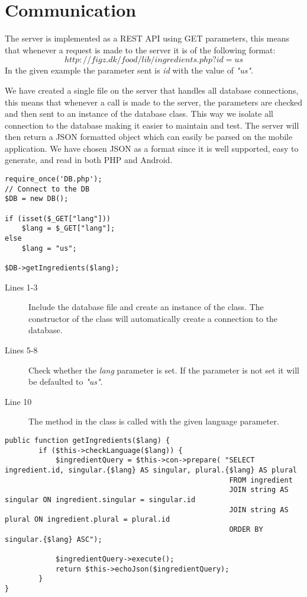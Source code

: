 \section{Communication}
\label{sec:com}

The server is implemented as a REST API using GET parameters, this means that whenever a request is made to the server it is of the following format: $$http://figz.dk/food/lib/ingredients.php?id=us$$ In the given example the parameter sent is \textit{id} with the value of \textit{"us"}.

We have created a single file on the server that handles all database connections, this means that whenever a call is made to the server, the parameters are checked and then sent to an instance of the database class. This way we isolate all connection to the database making it easier to maintain and test. The server will then return a JSON formatted object which can easily be parsed on the mobile application. We have chosen JSON as a format since it is well supported, easy to generate, and read in both PHP and Android.

\begin{lstlisting}[language=phpstyle, caption=ingredients.php]
require_once('DB.php');
// Connect to the DB
$DB = new DB();

if (isset($_GET["lang"]))
	$lang = $_GET["lang"];
else
	$lang = "us";

$DB->getIngredients($lang);
\end{lstlisting}%

\begin{description}
\item[Lines 1-3] Include the database file and create an instance of the  class. The constructor of the  class will automatically create a connection to the database.
\item[Lines 5-8] Check whether the \textit{lang} parameter is set. If the parameter is not set it will be defaulted to \textit{"us"}.
\item[Line 10] The method  in the  class is called with the given language parameter.
\end{description}

\begin{lstlisting}[language=phpstyle, label=lst:getIngredients, caption=getIngredients() method of DB class]
public function getIngredients($lang) {
        if ($this->checkLanguage($lang)) {
            $ingredientQuery = $this->con->prepare( "SELECT ingredient.id, singular.{$lang} AS singular, plural.{$lang} AS plural
            			                             FROM ingredient
            			                             JOIN string AS singular ON ingredient.singular = singular.id
            			                             JOIN string AS plural ON ingredient.plural = plural.id
                                                     ORDER BY singular.{$lang} ASC");

            $ingredientQuery->execute();
            return $this->echoJson($ingredientQuery);
        }
}
\end{lstlisting}%

